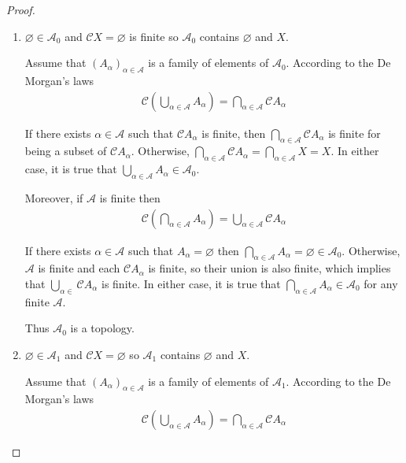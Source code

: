 \begin{proof}
    \begin{enumerate}[label={(\alph*)},leftmargin=*]
        \item \( \varnothing \in \mathscr{A}_{0} \) and \( \mathscr{C}X = \varnothing \) is finite so \( \mathscr{A}_{0} \) contains \( \varnothing \) and \( X \).

              Assume that \( {(A_{\alpha})}_{\alpha\in\mathscr{A}} \) is a family of elements of \( \mathscr{A}_{0} \). According to the De Morgan's laws
              \begin{align*}
                  \mathscr{C}\left( \bigcup_{\alpha\in\mathscr{A}} A_{\alpha} \right) = \bigcap_{\alpha\in\mathscr{A}} \mathscr{C}A_{\alpha}
              \end{align*}

              If there exists \( \alpha \in \mathscr{A} \) such that \( \mathscr{C}A_{\alpha} \) is finite, then \( \bigcap_{\alpha\in\mathscr{A}} \mathscr{C}A_{\alpha} \) is finite for being a subset of \( \mathscr{C}A_{\alpha} \). Otherwise, \( \bigcap_{\alpha\in\mathscr{A}} \mathscr{C}A_{\alpha} = \bigcap_{\alpha\in\mathscr{A}} X = X \). In either case, it is true that \( \bigcup_{\alpha\in\mathscr{A}} A_{\alpha} \in \mathscr{A}_{0} \).

              Moreover, if \( \mathscr{A} \) is finite then
              \begin{align*}
                  \mathscr{C}\left( \bigcap_{\alpha\in\mathscr{A}} A_{\alpha} \right) = \bigcup_{\alpha\in\mathscr{A}} \mathscr{C}A_{\alpha}
              \end{align*}

              If there exists \( \alpha \in \mathscr{A} \) such that \( A_{\alpha} = \varnothing \) then \( \bigcap_{\alpha\in\mathscr{A}} A_{\alpha} = \varnothing \in \mathscr{A}_{0} \). Otherwise, \( \mathscr{A} \) is finite and each \( \mathscr{C}A_{\alpha} \) is finite, so their union is also finite, which implies that \( \bigcup_{\alpha\in}\mathscr{C}A_{\alpha} \) is finite. In either case, it is true that \( \bigcap_{\alpha\in\mathscr{A}} A_{\alpha} \in \mathscr{A}_{0} \) for any finite \( \mathscr{A} \).

              Thus \( \mathscr{A}_{0} \) is a topology.
        \item \( \varnothing \in \mathscr{A}_{1} \) and \( \mathscr{C}X = \varnothing \) so \( \mathscr{A}_{1} \) contains \( \varnothing \) and \( X \).

              Assume that \( {(A_{\alpha})}_{\alpha\in\mathscr{A}} \) is a family of elements of \( \mathscr{A}_{1} \). According to the De Morgan's laws
              \begin{align*}
                  \mathscr{C}\left( \bigcup_{\alpha\in\mathscr{A}} A_{\alpha} \right) = \bigcap_{\alpha\in\mathscr{A}} \mathscr{C}A_{\alpha}
              \end{align*}


\end{enumerate}
\end{proof}
